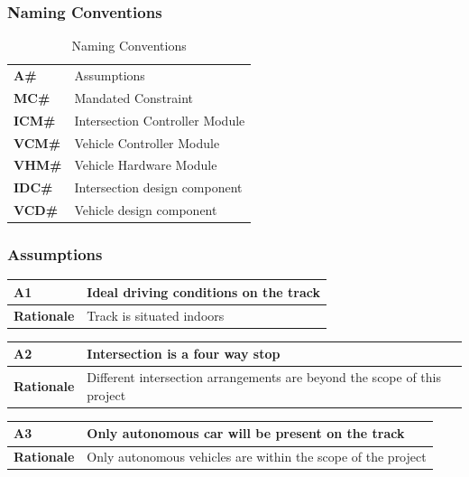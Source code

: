 \documentclass [10pt]{article}
\begin{document}
\subsubsection{Naming Conventions}
\begin{longtable}{ |p{ } p{ }|} \caption{Naming Conventions} \\ \hline
\textbf{A\#} & Assumptions \\ 
\rowcolor{tableCell}\textbf{MC\#} & Mandated Constraint \\ 
\textbf{ICM\#} & Intersection Controller Module \\ 

\rowcolor{tableCell}\textbf{VCM\#} & Vehicle Controller Module\\
\textbf{VHM\#}  & Vehicle Hardware Module \\

\rowcolor{tableCell}\textbf{IDC\#} & Intersection design component\\
\textbf{VCD\#}  & Vehicle design component \\\hline

\end{longtable}
\subsubsection{Assumptions}

\begin{longtable}{| p{ } | p{ } | }\hline 
\rowcolor{tableCell}\textbf{A1} & Ideal driving conditions on the track \\ \hline
\textbf{Rationale} & Track is situated indoors \\ \hline 
\end{longtable}

\begin{longtable}{| p{ } | p{ } | }\hline 
\rowcolor{tableCell}\textbf{A2} & Intersection is a four way stop \\ \hline
\textbf{Rationale} &  Different intersection arrangements are beyond the scope of this project \\ \hline
\end{longtable}

\begin{longtable}{| p{ } | p{ } | }\hline 
\rowcolor{tableCell}\textbf{A3} & Only autonomous car will be present on the track \\ \hline
\textbf{Rationale} & Only autonomous vehicles are within the scope of the project \\ \hline
\end{longtable}
\end{document}
